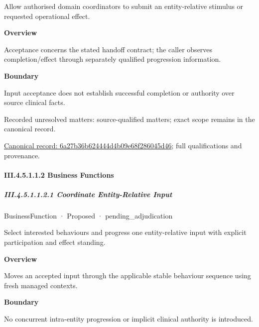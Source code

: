 Allow authorised domain coordinators to submit an entity-relative stimulus or requested operational effect.



\textbf{Overview}



Acceptance concerns the stated handoff contract; the caller observes completion/effect through separately qualified progression information.



\textbf{Boundary}



Input acceptance does not establish successful completion or authority over source clinical facts.


{\small Recorded unresolved matters: source-qualified matters; exact scope remains in the canonical record.}\par
{\footnotesize \href{../../../../continuum/business/business-service/6a27b36b624444d4b09e68f286045d46.md}{Canonical record: 6a27b36b624444d4b09e68f286045d46}; full qualifications and provenance.}\par
\paragraph*{III.4.5.1.1.2 Business Functions}
\label{navigation:III.4.5.1.1.2}

\subparagraph*{III.4.5.1.1.2.1 Coordinate Entity-Relative Input}
\label{navigation:III.4.5.1.1.2.1}

\label{element:78417d5c46cc406f95e6a41d22e3f143}
{\small BusinessFunction · Proposed · pending\_adjudication}\par

Select interested behaviours and progress one entity-relative input with explicit participation and effect standing.



\textbf{Overview}



Moves an accepted input through the applicable stable behaviour sequence using fresh managed contexts.



\textbf{Boundary}



No concurrent intra-entity progression or implicit clinical authority is introduced.


